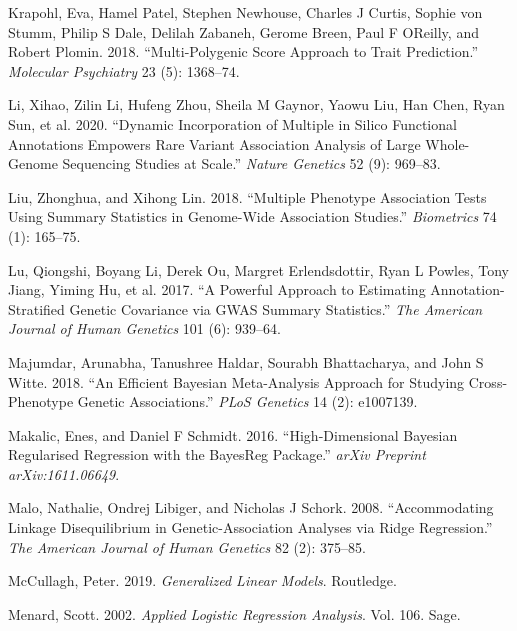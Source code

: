 \begin{CSLReferences}{1}{0}
\leavevmode{}%
Krapohl, Eva, Hamel Patel, Stephen Newhouse, Charles J Curtis, Sophie von Stumm, Philip S Dale, Delilah Zabaneh, Gerome Breen, Paul F OReilly, and Robert Plomin. 2018. {``Multi-Polygenic Score Approach to Trait Prediction.''} \emph{Molecular Psychiatry} 23 (5): 1368--74.

\leavevmode{}%
Li, Xihao, Zilin Li, Hufeng Zhou, Sheila M Gaynor, Yaowu Liu, Han Chen, Ryan Sun, et al. 2020. {``Dynamic Incorporation of Multiple in Silico Functional Annotations Empowers Rare Variant Association Analysis of Large Whole-Genome Sequencing Studies at Scale.''} \emph{Nature Genetics} 52 (9): 969--83.

\leavevmode{}%
Liu, Zhonghua, and Xihong Lin. 2018. {``Multiple Phenotype Association Tests Using Summary Statistics in Genome-Wide Association Studies.''} \emph{Biometrics} 74 (1): 165--75.

\leavevmode{}%
Lu, Qiongshi, Boyang Li, Derek Ou, Margret Erlendsdottir, Ryan L Powles, Tony Jiang, Yiming Hu, et al. 2017. {``A Powerful Approach to Estimating Annotation-Stratified Genetic Covariance via GWAS Summary Statistics.''} \emph{The American Journal of Human Genetics} 101 (6): 939--64.

\leavevmode{}%
Majumdar, Arunabha, Tanushree Haldar, Sourabh Bhattacharya, and John S Witte. 2018. {``An Efficient Bayesian Meta-Analysis Approach for Studying Cross-Phenotype Genetic Associations.''} \emph{PLoS Genetics} 14 (2): e1007139.

\leavevmode{}%
Makalic, Enes, and Daniel F Schmidt. 2016. {``High-Dimensional Bayesian Regularised Regression with the BayesReg Package.''} \emph{arXiv Preprint arXiv:1611.06649}.

\leavevmode{}%
Malo, Nathalie, Ondrej Libiger, and Nicholas J Schork. 2008. {``Accommodating Linkage Disequilibrium in Genetic-Association Analyses via Ridge Regression.''} \emph{The American Journal of Human Genetics} 82 (2): 375--85.

\leavevmode{}%
McCullagh, Peter. 2019. \emph{Generalized Linear Models}. Routledge.

\leavevmode{}%
Menard, Scott. 2002. \emph{Applied Logistic Regression Analysis}. Vol. 106. Sage.


\end{CSLReferences}
